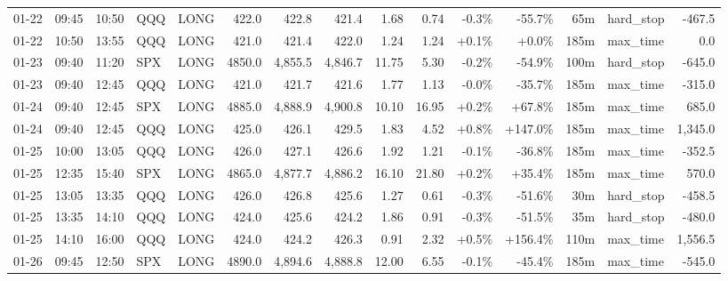 \documentclass[11pt,a4paper,twoside]{article}
\begin{document}
\begin{landscape}
\begin{center}
\begin{longtable}{>{\color{txtmain}}l l l l l r r r r r r r r >{\color{txtmain}}l r}
01-22 & 09:45 & 10:50 & QQQ & LONG & 422.0 & 422.8 & 421.4 & 1.68 & 0.74 & \textcolor{lossred}{-0.3\%} & \textcolor{lossred}{-55.7\%} & 65m & hard\_stop & \textcolor{lossred}{-467.5} \\
01-22 & 10:50 & 13:55 & QQQ & LONG & 421.0 & 421.4 & 422.0 & 1.24 & 1.24 & \textcolor{wingreen}{+0.1\%} & \textcolor{wingreen}{+0.0\%} & 185m & max\_time & \textcolor{wingreen}{0.0} \\
01-23 & 09:40 & 11:20 & SPX & LONG & 4850.0 & 4,855.5 & 4,846.7 & 11.75 & 5.30 & \textcolor{lossred}{-0.2\%} & \textcolor{lossred}{-54.9\%} & 100m & hard\_stop & \textcolor{lossred}{-645.0} \\
01-23 & 09:40 & 12:45 & QQQ & LONG & 421.0 & 421.7 & 421.6 & 1.77 & 1.13 & \textcolor{lossred}{-0.0\%} & \textcolor{lossred}{-35.7\%} & 185m & max\_time & \textcolor{lossred}{-315.0} \\
01-24 & 09:40 & 12:45 & SPX & LONG & 4885.0 & 4,888.9 & 4,900.8 & 10.10 & 16.95 & \textcolor{wingreen}{+0.2\%} & \textcolor{wingreen}{+67.8\%} & 185m & max\_time & \textcolor{wingreen}{685.0} \\
01-24 & 09:40 & 12:45 & QQQ & LONG & 425.0 & 426.1 & 429.5 & 1.83 & 4.52 & \textcolor{wingreen}{+0.8\%} & \textcolor{wingreen}{+147.0\%} & 185m & max\_time & \textcolor{wingreen}{1,345.0} \\
01-25 & 10:00 & 13:05 & QQQ & LONG & 426.0 & 427.1 & 426.6 & 1.92 & 1.21 & \textcolor{lossred}{-0.1\%} & \textcolor{lossred}{-36.8\%} & 185m & max\_time & \textcolor{lossred}{-352.5} \\
01-25 & 12:35 & 15:40 & SPX & LONG & 4865.0 & 4,877.7 & 4,886.2 & 16.10 & 21.80 & \textcolor{wingreen}{+0.2\%} & \textcolor{wingreen}{+35.4\%} & 185m & max\_time & \textcolor{wingreen}{570.0} \\
01-25 & 13:05 & 13:35 & QQQ & LONG & 426.0 & 426.8 & 425.6 & 1.27 & 0.61 & \textcolor{lossred}{-0.3\%} & \textcolor{lossred}{-51.6\%} & 30m & hard\_stop & \textcolor{lossred}{-458.5} \\
01-25 & 13:35 & 14:10 & QQQ & LONG & 424.0 & 425.6 & 424.2 & 1.86 & 0.91 & \textcolor{lossred}{-0.3\%} & \textcolor{lossred}{-51.5\%} & 35m & hard\_stop & \textcolor{lossred}{-480.0} \\
01-25 & 14:10 & 16:00 & QQQ & LONG & 424.0 & 424.2 & 426.3 & 0.91 & 2.32 & \textcolor{wingreen}{+0.5\%} & \textcolor{wingreen}{+156.4\%} & 110m & max\_time & \textcolor{wingreen}{1,556.5} \\
01-26 & 09:45 & 12:50 & SPX & LONG & 4890.0 & 4,894.6 & 4,888.8 & 12.00 & 6.55 & \textcolor{lossred}{-0.1\%} & \textcolor{lossred}{-45.4\%} & 185m & max\_time & \textcolor{lossred}{-545.0} \\

\end{longtable}
\end{center}
\end{landscape}
\end{document}
